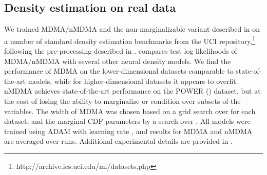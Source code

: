 \documentclass{article}
\begin{document}
%
 

\subsection{Density estimation on real data}

We trained MDMA/nMDMA and the non-marginalizable variant described in  on a number of standard density estimation benchmarks from the UCI repository,\footnote{http://archive.ics.uci.edu/ml/datasets.php} following the pre-processing described in \cite{papamakarios2017masked}. 
 compares test log likelihoods of 
MDMA/nMDMA with several other neural density models.  
We find the performance of MDMA on the lower-dimensional datasets  comparable to state-of-the-art models, while for higher-dimensional datasets it appears to overfit. nMDMA achieves state-of-the-art performance on the POWER () dataset, but at the cost of losing the ability to marginalize or condition over subsets of the variables. The width of MDMA was chosen based on a grid search over  for each dataset, and the marginal CDF parameters by a search over . All models were trained using ADAM with learning rate , and results for MDMA and nMDMA are averaged over  runs.  
Additional experimental details are provided in . 
\end{document}
